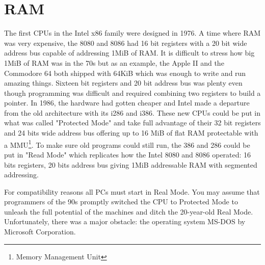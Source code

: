 \documentclass[book.tex]{subfiles}
\begin{document}
\section{RAM}
The first CPUs in the Intel x86 family were designed in 1976. A time where RAM was very expensive, the 8080 and 8086 had 16 bit registers with a 20 bit wide address bus capable of addressing 1MiB of RAM. It is difficult to stress how big 1MiB of RAM was in the 70s but as an example, the Apple II and the Commodore 64 both shipped with 64KiB which was enough to write and run amazing things. Sixteen bit registers and 20 bit address bus was plenty even though programming was difficult and required combining two registers to build a pointer. In 1986, the hardware had gotten cheaper and Intel made a departure from the old architecture with its i286 and i386. These new CPUs could be put in what was called "Protected Mode" and take full advantage of their 32 bit registers and 24 bits wide address bus offering up to 16 MiB of flat RAM protectable with a MMU\footnote{Memory Management Unit}. To make sure old programs could still run, the 386 and 286 could be put in "Read Mode" which replicates how the Intel 8080 and 8086 operated: 16 bits registers, 20 bits address bus giving 1MiB addressable RAM with segmented addressing.\\
\par
For compatibility reasons all PCs must start in Real Mode. You may assume that programmers of the 90s promptly switched the CPU to Protected Mode to unleash the full potential of the machines and ditch the 20-year-old Real Mode. Unfortunately, there was a major obstacle: the operating system MS-DOS by Microsoft Corporation.
  
\end{document}
